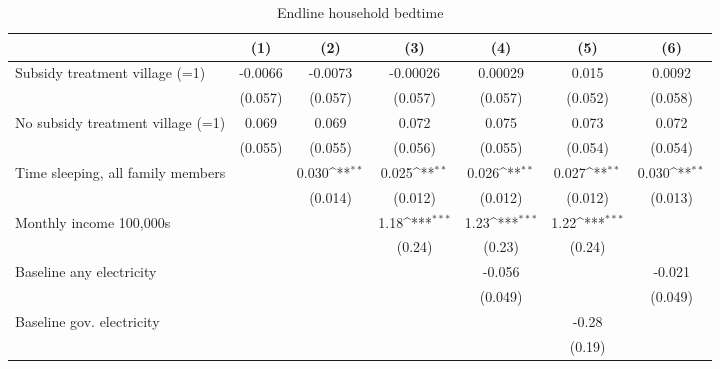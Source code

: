 \begin{table}[htbp]\centering
\def\sym#1{\ifmmode^{#1}\else\(^{#1}\)\fi}
\caption{Endline household bedtime}
\begin{tabular*}{1\hsize}{@{\hskip\tabcolsep\extracolsep\fill}l*{6}{c}}
\toprule
                &\multicolumn{1}{c}{(1)}         &\multicolumn{1}{c}{(2)}         &\multicolumn{1}{c}{(3)}         &\multicolumn{1}{c}{(4)}         &\multicolumn{1}{c}{(5)}         &\multicolumn{1}{c}{(6)}         \\
\midrule
Subsidy treatment village (=1)&  -0.0066         &  -0.0073         & -0.00026         &  0.00029         &    0.015         &   0.0092         \\
                &  (0.057)         &  (0.057)         &  (0.057)         &  (0.057)         &  (0.052)         &  (0.058)         \\
No subsidy treatment village (=1)&    0.069         &    0.069         &    0.072         &    0.075         &    0.073         &    0.072         \\
                &  (0.055)         &  (0.055)         &  (0.056)         &  (0.055)         &  (0.054)         &  (0.054)         \\
Time sleeping, all family members&                  &    0.030\sym{**} &    0.025\sym{**} &    0.026\sym{**} &    0.027\sym{**} &    0.030\sym{**} \\
                &                  &  (0.014)         &  (0.012)         &  (0.012)         &  (0.012)         &  (0.013)         \\
Monthly income 100,000s&                  &                  &     1.18\sym{***}&     1.23\sym{***}&     1.22\sym{***}&                  \\
                &                  &                  &   (0.24)         &   (0.23)         &   (0.24)         &                  \\
Baseline any electricity&                  &                  &                  &   -0.056         &                  &   -0.021         \\
                &                  &                  &                  &  (0.049)         &                  &  (0.049)         \\
Baseline gov. electricity&                  &                  &                  &                  &    -0.28         &                  \\
                &                  &                  &                  &                  &   (0.19)         &                  \\

\end{tabular*}
\end{table}
